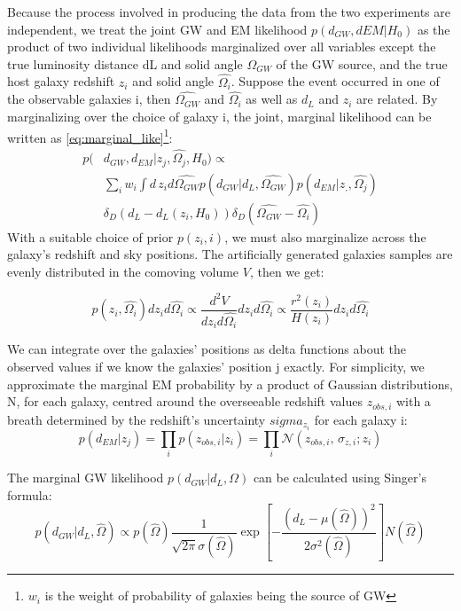 Because the process involved in producing the data from the two experiments are independent, we treat the joint GW and EM likelihood $p(d_{GW},d{EM}|H_0)$ as the product of two individual likelihoods marginalized over all variables except the true luminosity distance dL and solid angle $\Omega_{GW}$ of the GW source, and the true host galaxy redshift $z_i$ and solid angle $\hat{\Omega_i}$. Suppose the event occurred in one of the observable galaxies i, then $ \hat{\Omega_{GW}}$ and $\hat{\Omega_i}$  as well as $d_L$ and $z_i$ are related. By marginalizing over the choice of galaxy i, the joint, marginal likelihood can be written as \ref{eq:marginal_like}\footnote{$w_i$ is the weight of probability of galaxies being the source of GW}: 
\begin{align}
    p(&d_{GW}, d_{EM}|{z_j, \hat{\Omega_j}},H_0)  \propto  \nonumber\\
    &\sum_{i} w_i \int d\,z_i d \hat{\Omega_{GW}} p(d_{GW}|d_L, \hat{\Omega_{GW}}) 
    p(d_{EM}|{z_,, \hat{\Omega_j}}) \nonumber\\
    & \delta_D (d_L - d_L(z_i, H_0)) \delta_D (\hat{\Omega_{GW}} - \hat{\Omega_i})
    \label{eq:marginal_like}
\end{align}
With a suitable choice of prior $p(z_i, i)$, we must also marginalize across the galaxy's redshift and sky positions. The artificially generated galaxies samples are evenly distributed in the comoving volume $V$, then we get:

\begin{equation}
    p(z_i, \hat{\Omega_i})dz_i d\hat{\Omega_i} \propto \frac{d^2 V}{dz_i d\hat{\Omega_i}} dz_i d\hat{\Omega_i} \propto \frac{r^2 (z_i)}{H(z_i)}dz_i d\hat{\Omega_i}
\end{equation}

We can integrate over the galaxies’ positions as delta functions about the observed values if we know the galaxies’ position j exactly. For simplicity, we approximate the marginal EM probability by a product of Gaussian distributions, N, for each galaxy, centred around the overseeable redshift values $z_{obs,i}$ with a breath determined by the redshift’s uncertainty $sigma_{z_i}$ for each galaxy i:
\begin{equation}
    p(d_{EM}|{z_j}) = \prod_i p(z_{obs,i}|z_i) = \prod_i \mathcal{N}(z_{obs,i},\,\sigma_{z,i};z_i)
\end{equation}


The marginal GW likelihood $p(d_{GW}|d_L,\Omega)$ can be calculated using Singer's formula:
\begin{equation}
    p(d_{GW}|d_L, \hat{\Omega})\propto p(\hat{\Omega})\frac{1}{\sqrt{2\pi}\sigma(\hat{\Omega})} \exp[-\frac{(d_L - \mu(\hat{\Omega}))^2}{2\sigma^2(\hat{\Omega})}] N(\hat{\Omega})
    \label{eq:GW_like}
\end{equation}

